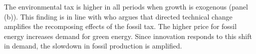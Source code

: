 %
%
%




The environmental tax is higher in all periods when growth is exogenous (panel (b)). This finding is in line with \cite{Fried2018ClimateAnalysis} who argues that directed technical change amplifies the recomposing effects of the fossil tax. The higher price for fossil energy increases demand for green energy. Since innovation responds to this shift in demand, the slowdown in fossil production is amplified. 


